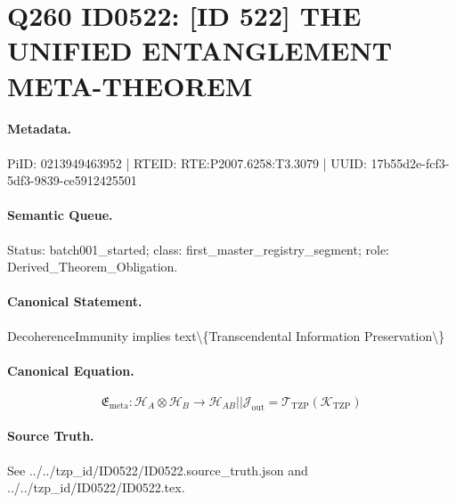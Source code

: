 \section*{Q260 ID0522: [ID 522] THE UNIFIED ENTANGLEMENT META-THEOREM}
\paragraph{Metadata.}
PiID: 0213949463952 | RTEID: RTE:P2007.6258:T3.3079 | UUID: 17b55d2e-fcf3-5df3-9839-ce5912425501

\paragraph{Semantic Queue.}
Status: batch001\_started; class: first\_master\_registry\_segment; role: Derived\_Theorem\_Obligation.

\paragraph{Canonical Statement.}
DecoherenceImmunity implies text\textbackslash{}\{Transcendental Information Preservation\textbackslash{}\}

\paragraph{Canonical Equation.}
\[
\mathfrak{E}_{\mathrm{meta}}:\mathcal{H}_A\otimes\mathcal{H}_B\longrightarrow \mathcal{H}_{AB} || \mathcal{J}_{\mathrm{out}}=\mathcal{T}_{\mathrm{TZP}}\!\left(\mathcal{K}_{\mathrm{TZP}}\right)
\]

\paragraph{Source Truth.}
See ../../tzp\_id/ID0522/ID0522.source\_truth.json and ../../tzp\_id/ID0522/ID0522.tex.
